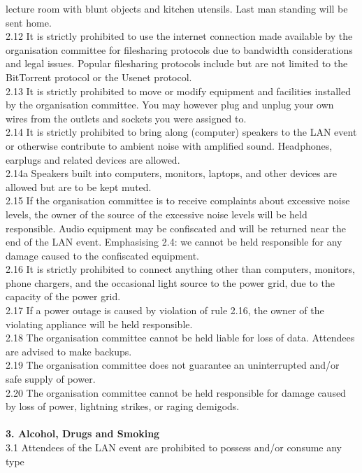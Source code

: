 \documentclass{article}
\begin{document}
lecture room with blunt objects and kitchen utensils. Last man standing will be
sent home.\\
2.12 It is strictly prohibited to use the internet connection made available by 
the organisation committee for filesharing protocols due to bandwidth 
considerations and legal issues. Popular filesharing protocols include but are 
not limited to the BitTorrent protocol or the Usenet protocol.\\
2.13 It is strictly prohibited to move or modify equipment and facilities 
installed by the organisation committee. You may however plug and unplug your 
own wires from the outlets and sockets you were assigned to.\\
2.14 It is strictly prohibited to bring along (computer) speakers to the LAN 
event or otherwise contribute to ambient noise with amplified sound. Headphones, 
earplugs and related devices are allowed. \\
2.14a Speakers built into computers, monitors, laptops, and other devices are 
allowed but are to be kept muted.\\
2.15 If the organisation committee is to receive complaints about excessive 
noise levels, the owner of the source of the excessive noise levels will be held 
responsible. Audio equipment may be confiscated and will be returned near the 
end of the LAN event. Emphasising 2.4: we cannot be held responsible for any 
damage caused to the confiscated equipment.\\
2.16 It is strictly prohibited to connect anything other than computers, 
monitors, phone chargers, and the occasional light source to the power grid, due 
to the capacity of the power grid. \\
2.17 If a power outage is caused by violation of rule 2.16, the owner of the 
violating appliance will be held responsible.\\
2.18 The organisation committee cannot be held liable for loss of data. 
Attendees are advised to make backups.\\
2.19 The organisation committee does not guarantee an uninterrupted and/or safe 
supply of power.\\
2.20 The organisation committee cannot be held responsible for damage caused by 
loss of power, lightning strikes, or raging demigods.\\
\\
\textbf{3. Alcohol, Drugs and Smoking}\\
3.1 Attendees of the LAN event are prohibited to possess and/or consume any type 
\end{document}
